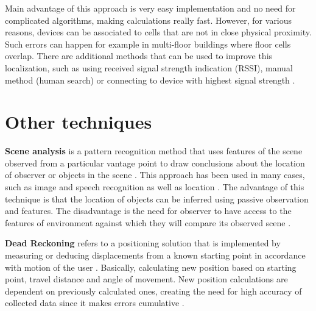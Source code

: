 Main advantage of this approach is very easy implementation and no need for complicated algorithms, making calculations really fast. However, for various reasons, devices can be associated to cells that are not in close physical proximity. Such errors can happen for example in multi-floor buildings where floor cells overlap. There are additional methods that can be used to improve this localization, such as using received signal strength indication (RSSI), manual method (human search) or connecting to device with highest signal strength \cite{WiFiLBS, RAinWILTaS}.

\section{Other techniques}
\textbf{Scene analysis} is a pattern recognition method that uses features of the scene observed from a particular vantage point to draw conclusions about the location of observer or objects in the scene \cite{LSfUC}. This approach has been used in many cases, such as image and speech recognition as well as location \cite{LSAWIFI}. The advantage of this technique is that the location of objects can be inferred using passive observation and features. The disadvantage is the need for observer to have access to the features of environment against which they will compare its observed scene \cite{LSfUC}.

\medskip

\textbf{Dead Reckoning} refers to a positioning solution that is implemented by measuring or deducing displacements from a known starting point in accordance with motion of the user \cite{DRNS}. Basically, calculating new position based on starting point, travel distance and angle of movement. New position calculations are dependent on previously calculated ones, creating the need for high accuracy of collected data since it makes errors cumulative \cite{IDRAIP}.